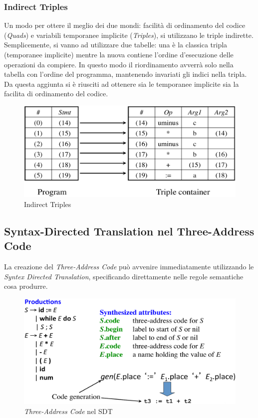 \subsubsection{Indirect Triples}
Un modo per ottere il meglio dei due mondi: facilit\`a di ordinamento del
codice (\textit{Quads}) e variabili temporanee implicite (\textit{Triples}),
si utilizzano le triple indirette. Semplicemente, si vanno ad utilizzare due
tabelle: una \`e la classica tripla (temporanee implicite) mentre la nuova
contiene l'ordine d'esecuzione delle operazioni da compiere. In questo modo il
riordinamento avverr\`a solo nella tabella con l'ordine del programma,
mantenendo invariati gli indici nella tripla. Da questa aggiunta si \`e
riusciti ad ottenere sia le temporanee implicite sia la facilita di ordinamento
del codice.

\begin{figure}[H]
  \centering
  \includegraphics[scale=0.4]{res/image/indirect_triples}
  \caption{Indirect Triples}
  \label{img:indirect_triples}
\end{figure}

\subsection{Syntax-Directed Translation nel Three-Address Code}
La creazione del \textit{Three-Address Code} pu\`o avvenire immediatamente
utilizzando le \textit{Syntex Directed Translation}, specificando direttamente
nelle regole semantiche cosa produrre.

\begin{figure}[H]
  \centering
  \includegraphics[scale=0.3]{res/image/traslation_tac}
  \caption{\textit{Three-Address Code} nel SDT}
  \label{img:traslation_tac}
\end{figure}

